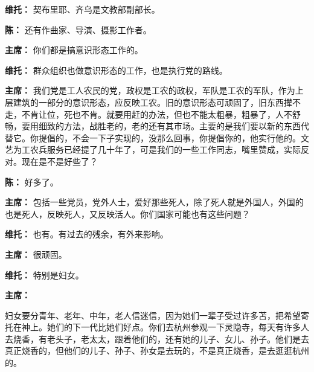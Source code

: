 \begin{duihua}
\item[\textbf{维托：}]{契布里耶、齐乌是文教部副部长。}
\item[\textbf{陈：}]{还有作曲家、导演、摄影工作者。}
\item[\textbf{主席：}]{你们都是搞意识形态工作的。}
\item[\textbf{维托：}]{群众组织也做意识形态的工作，也是执行党的路线。}
\item[\textbf{主席：}]{我们党是工人农民的党，政权是工农的政权，军队是工农的军队，作为上层建筑的一部分的意识形态，应反映工农。旧的意识形态可顽固了，旧东西撵不走，不肯让位，死也不肯。就要用赶的办法，但也不能太粗暴，粗暴了，人不舒畅，要用细致的方法，战胜老的，老的还有其市场。主要的是我们要以新的东西代替它。你提倡的，不会一下子实现的，没那么回事，你提倡你的，他实行他的。文艺为工农兵服务已经提了几十年了，可是我们的一些工作同志，嘴里赞成，实际反对。现在是不是好些了？}
\item[\textbf{陈：}]{好多了。}
\item[\textbf{主席：}]{包括一些党员，党外人士，爱好那些死人，除了死人就是外国人，外国的也是死人，反映死人，又反映活人。你们国家可能也有这些问题？}
\item[\textbf{维托：}]{也有。有过去的残余，有外来影响。}
\item[\textbf{主席：}]{很顽固。}
\item[\textbf{维托：}]{特别是妇女。}
\item[\textbf{主席：}]{妇女要分青年、老年、中年，老人信迷信，因为她们一辈子受过许多苫，把希望寄托在神上。她们的下一代比她们好点。你们去杭州参观一下灵隐寺，每天有许多人去烧香，有老头子，老太太，跟着他们的，还有她的儿子、女儿、孙子。他们是去真正烧香的，但他们的儿子、孙子、孙女是去玩的，不是真正烧香，是去逛逛杭州的。
    
}
\end{duihua}
